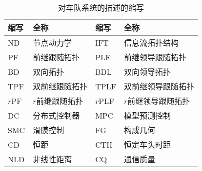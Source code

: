 \begin{translation}
\begin{table}
  \centering
  \caption{对车队系统的描述的缩写}
  \begin{tabular}{llll}
    \toprule
    缩写       &  全称           &  缩写       &  全称            \\
    \midrule
    ND        &  节点动力学      &  IFT        &  信息流拓扑结构    \\
    PF        &  前继跟随拓扑     &  PLF        &  前继领导跟随拓扑  \\
    BD        &  双向拓扑        &  BDL        &  双向领导拓扑     \\
    TPF       &  双前继跟随拓扑   &  TPLF       &  双前继领导跟随拓扑 \\
    $r$PF     &  $r$前继跟随拓扑  &  $r$PLF     &  $r$前继领导跟随拓扑 \\
    DC        &  分布式控制器     &  MPC        &  模型预测控制       \\
    SMC       &  滑膜控制        &  FG         &  构成几何           \\
    CD        &  恒距            &  CTH       &  恒定车头时距       \\
    NLD       &  非线性距离       &  CQ        &  通信质量          \\
    \bottomrule
  \end{tabular}
  \label{tab:appendix-translation-tableA1}
\end{table}


\end{translation}

